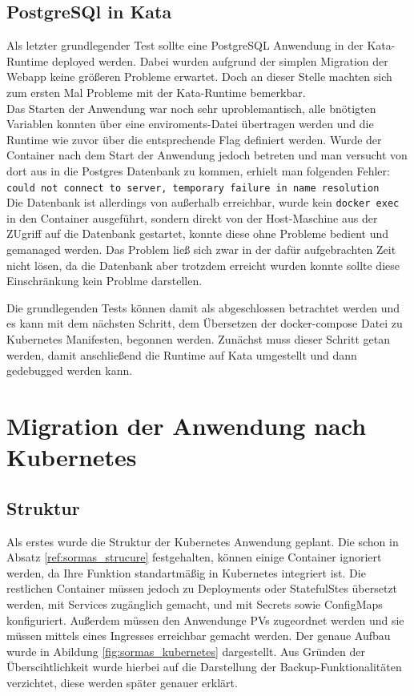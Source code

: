 \subsection{PostgreSQl in Kata}
Als letzter grundlegender Test sollte eine PostgreSQL Anwendung in der Kata-Runtime deployed werden. 
Dabei wurden aufgrund der simplen Migration der Webapp keine größeren Probleme erwartet.
Doch an dieser Stelle machten sich zum ersten Mal Probleme mit der Kata-Runtime bemerkbar.
\\
Das Starten der Anwendung war noch sehr uproblemantisch, alle bnötigten Variablen konnten über eine enviroments-Datei übertragen werden und die Runtime wie zuvor über die entsprechende Flag definiert werden. 
Wurde der Container nach dem Start der Anwendung jedoch betreten und man versucht von dort aus in die Postgres Datenbank zu kommen, erhielt man folgenden Fehler:
\\\texttt{could not connect to server, temporary failure in name resolution}\\
Die Datenbank ist allerdings von außerhalb erreichbar, wurde kein \texttt{docker exec} in den Container ausgeführt, sondern direkt von der Host-Maschine aus der ZUgriff auf die Datenbank gestartet, konnte diese ohne Probleme bedient und gemanaged werden. 
Das Problem ließ sich zwar in der dafür aufgebrachten Zeit nicht lösen, da die Datenbank aber trotzdem erreicht wurden konnte sollte diese Einschränkung kein Problme darstellen. 

Die grundlegenden Tests können damit als abgeschlossen betrachtet werden und es kann mit dem nächsten Schritt, dem Übersetzen der docker-compose Datei zu Kubernetes Manifesten, begonnen werden. 
Zunächst muss dieser Schritt getan werden, damit anschließend die Runtime auf Kata umgestellt und dann gedebugged werden kann. 


\section{Migration der Anwendung nach Kubernetes}
\subsection{Struktur}
Als erstes wurde die Struktur der Kubernetes Anwendung geplant. 
Die schon in Absatz \ref{ref:sormas_strucure} festgehalten, können einige Container ignoriert werden, da Ihre Funktion standartmäßig in Kubernetes integriert ist. 
Die restlichen Container müssen jedoch zu Deployments oder StatefulStes übersetzt werden, mit Services zugänglich gemacht, und mit Secrets sowie ConfigMaps konfiguriert. 
Außerdem müssen den Anwendunge \ac{PV}s zugeordnet werden und sie müssen mittels eines Ingresses erreichbar gemacht werden.
Der genaue Aufbau wurde in Abildung \ref{fig:sormas_kubernetes} dargestellt. 
Aus Gründen der Überscihtlichkeit wurde hierbei auf die Darstellung der Backup-Funktionalitäten verzichtet, diese werden später genauer erklärt.

